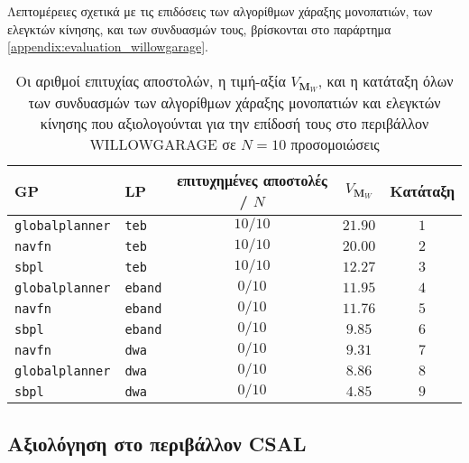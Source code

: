 Λεπτομέρειες σχετικά με τις επιδόσεις των αλγορίθμων χάραξης μονοπατιών, των
ελεγκτών κίνησης, και των συνδυασμών τους, βρίσκονται στο παράρτημα
\ref{appendix:evaluation_willowgarage}.


\begin{table}[htb]\centering
\renewcommand{\arraystretch}{1.3}
\begin{tabular}{llccc}
  GP                     & LP             & επιτυχημένες αποστολές / $N$ & $V_{\bm{M}_W}$ & Κατάταξη \\ \toprule
  \texttt{globalplanner} & \texttt{teb}   & $10/10$                      & $21.90$        & $1$      \\
  \texttt{navfn}         & \texttt{teb}   & $10/10$                      & $20.00$        & $2$      \\
  \texttt{sbpl}          & \texttt{teb}   & $10/10$                      & $12.27$        & $3$      \\
  \texttt{globalplanner} & \texttt{eband} & $0/10$                       & $11.95$        & $4$      \\
  \texttt{navfn}         & \texttt{eband} & $0/10$                       & $11.76$        & $5$      \\
  \texttt{sbpl}          & \texttt{eband} & $0/10$                       & $9.85$         & $6$      \\
  \texttt{navfn}         & \texttt{dwa}   & $0/10$                       & $9.31$         & $7$      \\
  \texttt{globalplanner} & \texttt{dwa}   & $0/10$                       & $8.86$         & $8$      \\
  \texttt{sbpl}          & \texttt{dwa}   & $0/10$                       & $4.85$         & $9$      \\ \bottomrule
\end{tabular}
\caption{\small Οι αριθμοί επιτυχίας αποστολών, η τιμή-αξία $V_{\bm{M}_W}$, και
         η κατάταξη όλων των συνδυασμών των αλγορίθμων χάραξης μονοπατιών και
         ελεγκτών κίνησης που αξιολογούνται για την επίδοσή τους στο
         περιβάλλον WILLOWGARAGE σε $N=10$ προσομοιώσεις}
\label{tbl:rank_willowgarage}
\end{table}



\subsection{Αξιολόγηση στο περιβάλλον CSAL}
  \label{subsection:02_01_04:04}

